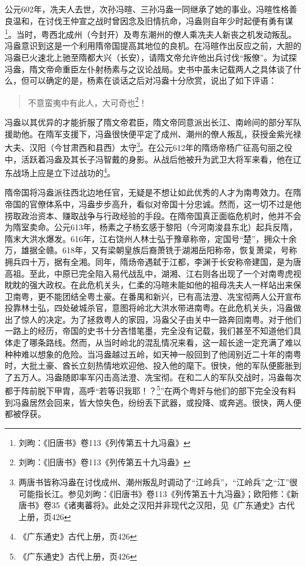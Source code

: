 \indent 公元602年，冼夫人去世，次孙冯暄、三孙冯盎一同继承了她的事业。冯暄性格善良温和，在讨伐王仲宣之战时曾因念及旧情抗命，冯盎则自年少时起便有勇有谋\footnote{刘昫：《旧唐书》卷113《列传第五十九冯盎》}。当时，粤西北成州（今封开）及粤东潮州的僚人乘冼夫人新丧之机发动叛乱。冯盎意识到这是一个利用隋帝国提高其地位的良机。在冯暄作出反应之前，大胆的冯盎已火速北上驰至隋都大兴（长安），请隋文帝允许他出兵讨伐“叛僚”。为试探冯盎，隋文帝命重臣左仆射杨素与之议论战局。史书中虽未记载两人之具体谈了什么，但可以确定的是，杨素在谈话之后对冯盎十分欣赏，说出了如下评语：

\begin{quote}
	不意蛮夷中有此人，大可奇也\footnote{刘昫：《旧唐书》卷113《列传第五十九冯盎》}！
\end{quote}

冯盎以其优异的才能折服了隋文帝君臣，隋文帝同意派出长江、南岭间的部分军队援助他。在隋军支援下，冯盎很快便平定了成州、潮州的僚人叛乱，获授金紫光禄大夫、汉阳（今甘肃西和县西）太守\footnote{两唐书皆称冯盎在讨伐成州、潮州叛乱时调动了“江岭兵”，“江岭兵”之“江”很可能指长江。参见刘昫：《旧唐书》卷113《列传第五十九冯盎》；欧阳修：《新唐书》卷35《诸夷蕃将》。此处之汉阳并非现代之汉阳，见《广东通史》古代上册，页426}。在公元612年的隋炀帝杨广征高句丽之役中，活跃着冯盎及其长子冯智戴的身影。从战后他被升为武卫大将军来看，他在辽东战场上应是立下过战功的\footnote{《广东通史》古代上册，页426}。

隋帝国将冯盎派往西北边地任官，无疑是不想让如此优秀的人才为南粤效力。在隋帝国的官僚体系中，冯盎步步高升，看似对帝国十分忠诚。然而，这一切不过是他捞取政治资本、赚取战争与行政经验的手段。在隋帝国真正面临危机时，他并不会为隋室卖命。公元613年，杨素之子杨玄感于黎阳（今河南浚县东北）起兵反隋，隋末大洪水爆发。616年，江右饶州人林士弘于豫章称帝，定国号“楚”，拥众十余万，雄据全赣。618年，又有梁朝皇族后裔萧铣于湖湘岳阳称帝，恢复萧梁，号称拥兵四十万，据有全湘。同年，隋炀帝遇弑于江都，李渊于长安称帝建国，是为唐高祖。至此，中原已完全陷入易代战乱中，湖湘、江右则各出现了一个对南粤虎视眈眈的强大政权。在此危机关头，仁柔的冯暄未能如他的祖母冼夫人一样站出来保卫南粤，更不能团结全粤土豪。在番禺和新兴，已有高法澄、冼宝彻两人公开宣布投靠林士弘，四处破城杀官，意图将岭北大洪水带进南粤。在此危机关头，冯盎做出了惊人的决定。为了拯救粤人的家园，冯盎父子由关中一路奔回南粤。对于他们一路上的经历，帝国的史书十分吝惜笔墨，完全没有记载，我们甚至不知道他们具体走了哪条路线。然而，从当时岭北的混乱情况来看，这一超长途一定充满了难以种种难以想象的危险。当冯盎越过五岭，如天神一般回到了他阔别近二十年的南粤时，大批土豪、酋长立刻热情地欢迎他、投入他的麾下。很快，他的军队便膨胀到了五万人。冯盎随即率军闪击高法澄、冼宝彻。在和二人的军队交战时，冯盎每次都于阵前脱下甲胄，高呼“若等识我耶！？\footnote{《广东通史》古代上册，页426}”在两个粤奸与他们的部下完全没有料到冯盎居然会回来，皆大惊失色，纷纷丢下武器，或投降、或奔逃。很快，两人便都被俘获。

